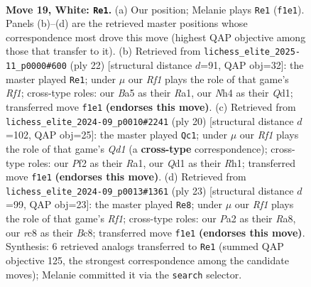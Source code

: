\documentclass[11pt]{article}
\begin{document}
\begin{figure}[p]
\label{fig:thought-m34}
\end{figure}

\clearpage

\begin{figure}[p]\centering
\begin{subfigure}{0.46\textwidth}\centering
\resizebox{\linewidth}{!}{%
\newchessgame
\chessboard[
  setfen={rnr2bk1/1p1b1pp1/p1q1pn2/B6p/7N/3BP3/PP2NPPP/R2Q1RK1 w - - 0 19},
  showmover=false,
  pgfstyle=straightmove, color=movearrow, markmove={f1-e1}
]}
\caption{}
\end{subfigure}\hfill
\begin{subfigure}{0.46\textwidth}\centering
\resizebox{\linewidth}{!}{%
\newchessgame
\chessboard[
  setfen={r1bq1rk1/pp2bppp/2n2n2/3p4/8/PNNB4/1PPB1PPP/R2Q1RK1 w - - 1 12},
  showmover=false,
  pgfstyle=straightmove, color=movearrow, markmove={f1-e1}
]}
\caption{}
\end{subfigure}
\\[4pt]
\begin{subfigure}{0.46\textwidth}\centering
\resizebox{\linewidth}{!}{%
\newchessgame
\chessboard[
  setfen={r1b1kb1r/pp3ppp/1qn2n2/8/3p4/6P1/PPPBNPBP/R2QK1NR w KQkq - 4 11},
  showmover=false,
  pgfstyle=straightmove, color=movearrow, markmove={d1-c1}
]}
\caption{}
\end{subfigure}\hfill
\begin{subfigure}{0.46\textwidth}\centering
\resizebox{\linewidth}{!}{%
\newchessgame
\chessboard[
  setfen={r1bq1rk1/p4pp1/2pb1n1p/n3p3/8/2NB1N2/PPPP1PPP/R1BQR1K1 b - - 3 12},
  showmover=false,
  pgfstyle=straightmove, color=movearrow, markmove={f8-e8}
]}
\caption{}
\end{subfigure}
\caption{\textbf{Move 19, White: \texttt{Re1}.} (a) Our position; Melanie plays \texttt{Re1} (\texttt{f1e1}). Panels (b)--(d) are the retrieved master positions whose correspondence most drove this move (highest QAP objective among those that transfer to it). (b) Retrieved from \texttt{lichess\_elite\_2025-11\_p0000\#600} (ply 22) [structural distance $d$=91, QAP obj=32]: the master played \texttt{Re1}; under $\mu$ our \emph{Rf1} plays the role of that game's \emph{Rf1}; cross-type roles: our \emph{B}a5 as their \emph{R}a1, our \emph{N}h4 as their \emph{Q}d1; transferred move \texttt{f1e1} \textbf{(endorses this move)}. (c) Retrieved from \texttt{lichess\_elite\_2024-09\_p0010\#2241} (ply 20) [structural distance $d$=102, QAP obj=25]: the master played \texttt{Qc1}; under $\mu$ our \emph{Rf1} plays the role of that game's \emph{Qd1} (a \textbf{cross-type} correspondence); cross-type roles: our \emph{P}f2 as their \emph{R}a1, our \emph{Q}d1 as their \emph{R}h1; transferred move \texttt{f1e1} \textbf{(endorses this move)}. (d) Retrieved from \texttt{lichess\_elite\_2024-09\_p0013\#1361} (ply 23) [structural distance $d$=99, QAP obj=23]: the master played \texttt{Re8}; under $\mu$ our \emph{Rf1} plays the role of that game's \emph{Rf1}; cross-type roles: our \emph{P}a2 as their \emph{R}a8, our \emph{r}c8 as their \emph{B}c8; transferred move \texttt{f1e1} \textbf{(endorses this move)}. Synthesis: 6 retrieved analogs transferred to \texttt{Re1} (summed QAP objective 125, the strongest correspondence among the candidate moves); Melanie committed it via the \texttt{search} selector.}

\end{figure}
\end{document}
